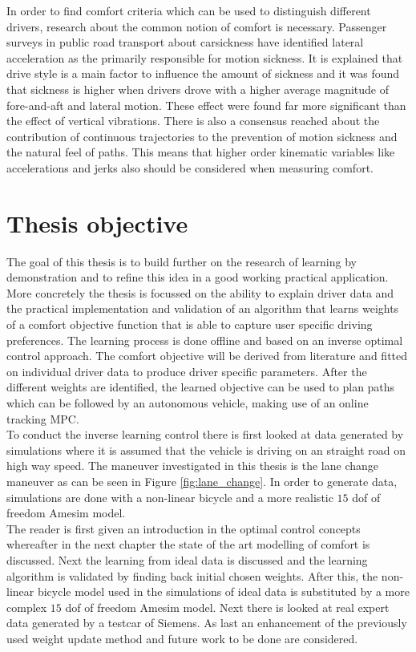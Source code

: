 In order to find comfort criteria which can be used to distinguish different drivers, research about the common notion of comfort is necessary. Passenger surveys in public road transport about carsickness \cite{Turner1999} have identified lateral acceleration as the primarily responsible for motion sickness. It is explained that drive style is a main factor to influence the amount of sickness and it was found that sickness is higher when drivers drove with a higher average magnitude of fore-and-aft and lateral motion. These effect were found far more significant than the effect of vertical vibrations. There is also a consensus reached about the contribution of continuous trajectories to the prevention of motion sickness and the natural feel of paths.\cite{Elbanhawi2015} This means that higher order kinematic variables like accelerations and jerks also should be considered when measuring comfort.\\

\section{Thesis objective}
The goal of this thesis is to build further on the research of learning by demonstration \cite{Kuderer2015a} and to refine this idea in a good working practical application. More concretely the thesis is focussed on the ability to explain driver data and the practical implementation and validation of an algorithm that learns weights of a comfort objective function that is able to capture user specific driving preferences. The learning process is done offline and based on an inverse optimal control approach. The comfort objective will be derived from literature and fitted on individual driver data to produce driver specific parameters. After the different weights are identified, the learned objective can be used to plan paths which can be followed by an autonomous vehicle, making use of an online tracking MPC.\\


To conduct the inverse learning control there is first looked at data generated by simulations where it is assumed that the vehicle is driving on an straight road on high way speed. The maneuver investigated in this thesis is the lane change maneuver as can be seen in Figure \ref{fig:lane_change}. In order to generate data, simulations are done with a non-linear bicycle and a more realistic $15$ dof of freedom Amesim model.\\
The reader is first given an introduction in the optimal control concepts whereafter in the next chapter the state of the art modelling of comfort is discussed. Next the learning from ideal data is discussed and the learning algorithm is validated by finding back initial chosen weights. After this, the non-linear bicycle model used in the simulations of ideal data is substituted by a more complex $15$ dof of freedom Amesim model. Next there is looked at real expert data generated by a testcar of Siemens. As last an enhancement of the previously used weight update method and future work to be done are considered.


